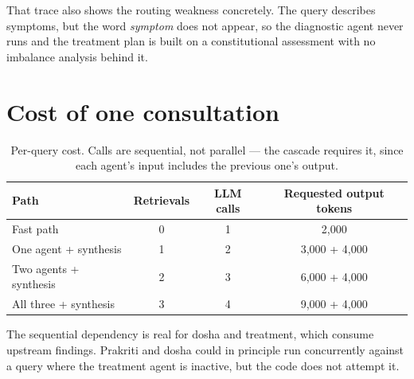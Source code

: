 That trace also shows the routing weakness concretely. The query describes symptoms, but the word \emph{symptom} does not appear, so the diagnostic agent never runs and the treatment plan is built on a constitutional assessment with no imbalance analysis behind it.

\section{Cost of one consultation}

\begin{table}[H]
\centering
\small
\begin{tabular}{@{}l c c c@{}}
\toprule
\textbf{Path} & \textbf{Retrievals} & \textbf{LLM calls} & \textbf{Requested output tokens} \\
\midrule
Fast path & 0 & 1 & 2,000 \\
One agent + synthesis & 1 & 2 & 3,000 + 4,000 \\
Two agents + synthesis & 2 & 3 & 6,000 + 4,000 \\
All three + synthesis & 3 & 4 & 9,000 + 4,000 \\
\bottomrule
\end{tabular}
\caption{Per-query cost. Calls are sequential, not parallel --- the cascade requires it, since each agent's input includes the previous one's output.}
\end{table}

The sequential dependency is real for dosha and treatment, which consume upstream findings. Prakriti and dosha could in principle run concurrently against a query where the treatment agent is inactive, but the code does not attempt it.
